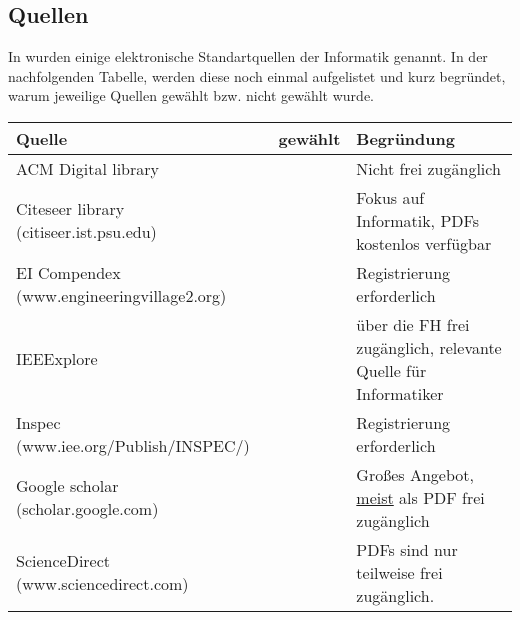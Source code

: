 \subsection{Quellen}
\label{subsec:quellen}
In \cite{Kitchenham2007} wurden einige elektronische Standartquellen der Informatik genannt. In der nachfolgenden Tabelle, werden diese noch einmal aufgelistet und kurz begründet, warum jeweilige Quellen gewählt bzw. nicht gewählt wurde.

\begin{tabular}[]{|L{6cm}|l|L{6cm}|}
	\hline
	 \textbf{Quelle} & \textbf{gewählt} & \textbf{Begründung} \\ 
	\hline
	ACM Digital library & \redX & Nicht frei zugänglich \\ 
	\hline
	Citeseer library (citiseer.ist.psu.edu) & \greenchecked & Fokus auf Informatik, PDFs kostenlos verfügbar \\ 
	\hline
	EI Compendex (www.engineeringvillage2.org) & \redX & Registrierung erforderlich \\ 
	\hline
	IEEExplore & \greenchecked & über die FH frei zugänglich, relevante Quelle für Informatiker \\ 
	\hline
	Inspec (www.iee.org/Publish/INSPEC/) & \redX & Registrierung erforderlich \\ 
	\hline
	Google scholar (scholar.google.com) & \greenchecked & Großes Angebot, \underline{meist} als PDF frei zugänglich \\ 
	\hline
	ScienceDirect (www.sciencedirect.com) & \redX & PDFs sind nur teilweise frei zugänglich. \\
	\hline
\end{tabular} 


